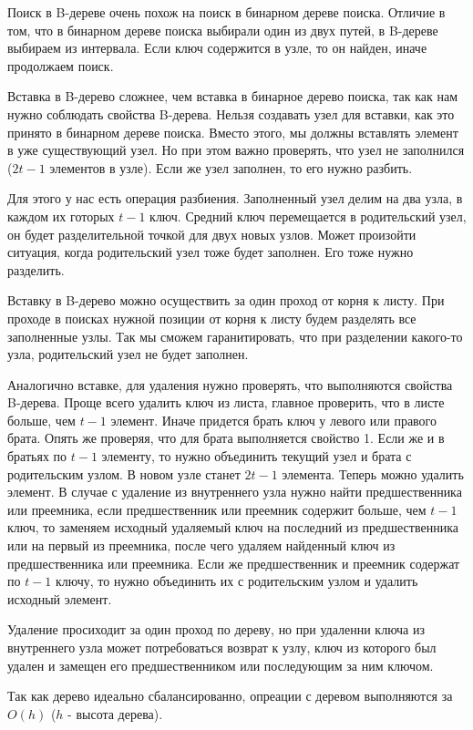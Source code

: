 Поиск в B-дереве очень похож на поиск в бинарном дереве поиска. Отличие в том, что в бинарном дереве поиска выбирали один из двух путей, 
в B-дереве выбираем из интервала. Если ключ содержится в узле, то он найден, иначе продолжаем поиск.


Вставка в B-дерево сложнее, чем вставка в бинарное дерево поиска, так как нам нужно соблюдать свойства B-дерева. 
Нельзя создавать узел для вставки, как это принято в бинарном дереве поиска. Вместо этого, мы должны вставлять элемент в уже существующий узел.
Но при этом важно проверять, что узел не заполнился ($2t-1$ элементов в узле). Если же узел заполнен, то его нужно разбить.

Для этого у нас есть операция разбиения. Заполненный узел делим на два узла, в каждом их готорых $t-1$ ключ. 
Средний ключ перемещается в родительский узел, он будет разделительной точкой для двух новых узлов. Может произойти ситуация, 
когда родительский узел тоже будет заполнен. Его тоже нужно разделить.

Вставку в B-дерево можно осуществить за один проход от корня к листу. 
При проходе в поисках нужной позиции от корня к листу будем разделять все заполненные узлы. Так мы сможем гаранитировать, 
что при разделении какого-то узла, родительский узел не будет заполнен.


Аналогично вставке, для удаления нужно проверять, что выполняются свойства B-дерева. Проще всего удалить ключ из листа, 
главное проверить, что в листе больше, чем $t-1$ элемент. Иначе придется брать ключ у левого или правого брата. Опять же проверяя, 
что для брата выполняется свойство 1. Если же и в братьях по $t-1$ элементу, то нужно объединить текущий узел и брата с родительским узлом.
В новом узле станет $2t-1$ элемента. Теперь можно удалить элемент.
В случае с удаление из внутреннего узла нужно найти предшественника или преемника, 
если предшественник или преемник содержит больше, чем $t-1$ ключ, то заменяем исходный удаляемый ключ на последний из предшественника или на первый из преемника,
после чего удаляем найденный ключ из предшественника или преемника.
Если же предшественник и преемник содержат по $t-1$ ключу, то нужно объединить их с родительским узлом и удалить исходный элемент.

Удаление просиходит за один проход по дереву, но при удаленни ключа из внутреннего узла может потребоваться возврат к узлу, 
ключ из которого был удален и замещен его предшественником или последующим за ним ключом.


Так как дерево идеально сбалансированно, опреации с деревом выполняются за $O(h)$ ($h$ - высота дерева).


